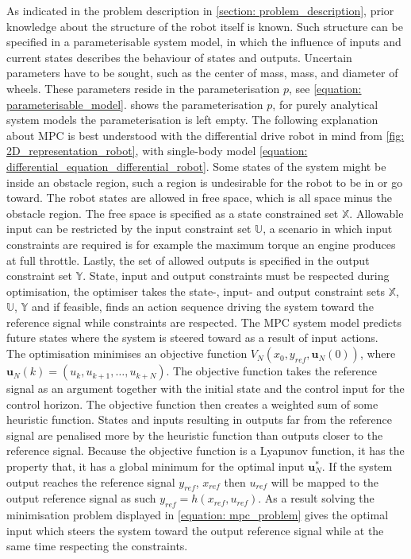 As indicated in the problem description in \cref{section: problem_description}, prior knowledge about the structure of the robot itself is known. Such structure can be specified in a parameterisable system model, in which the influence of inputs and current states describes the behaviour of states and outputs. Uncertain parameters have to be sought, such as the center of mass, mass, and diameter of wheels. These parameters reside in the parameterisation $p$, see \cref{equation: parameterisable_model}.  shows the parameterisation $p$, for purely analytical system models the parameterisation is left empty. The following explanation about \ac{MPC} is best understood with the differential drive robot in mind from \cref{fig: 2D_representation_robot}, with single-body model \cref{equation: differential_equation_differential_robot}. Some states of the system might be inside an obstacle region, such a region is undesirable for the robot to be in or go toward. The robot states are allowed in free space, which is all space minus the obstacle region. The free space is specified as a state constrained set $\mathbb{X}$. Allowable input can be restricted by the input constraint set $\mathbb{U}$, a scenario in which input constraints are required is for example the maximum torque an engine produces at full throttle. Lastly, the set of allowed outputs is specified in the output constraint set $\mathbb{Y}$. State, input and output constraints must be respected during optimisation, the optimiser takes the state-, input- and output constraint sets $\mathbb{X}$, $\mathbb{U}$, $\mathbb{Y}$ and if feasible, finds an action sequence driving the system toward the reference signal while constraints are respected. The \ac{MPC} system model predicts future states where the system is steered toward as a result of input actions.\\

The optimisation minimises an objective function $V_{N}(x_{0}, y_{ref}, \mathbf{u}_{N}(0))$, where\\ $ \mathbf{u}_{N}(k) = (u_k, u_{k+1}, \dots , u_{k+N})$. The objective function takes the reference signal as an argument together with the initial state and the control input for the control horizon. The objective function then creates a weighted sum of some heuristic function. States and inputs resulting in outputs far from the reference signal are penalised more by the heuristic function than outputs closer to the reference signal. Because the objective function is a Lyapunov function, it has the property that, it has a global minimum for the optimal input $\mathbf{u}_{N}^*$. If the system output reaches the reference signal $y_{ref}$, $x_{ref}$ then $u_{ref}$ will be mapped to the output reference signal as such $y_{ref} = h(x_{ref}, u_{ref})$. As a result solving the minimisation problem displayed in \cref{equation: mpc_problem} gives the optimal input which steers the system toward the output reference signal while at the same time respecting the constraints. 


